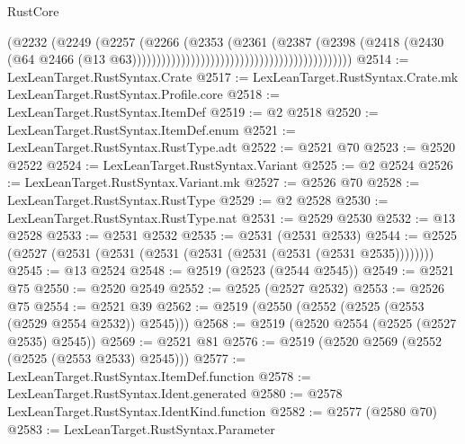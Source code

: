 \begin{lexlean}{RustCore}
\begin{coremodule}
                                                                      (@2232
                                                                        (@2249
                                                                          (@2257
                                                                            (@2266
                                                                              (@2353
                                                                                (@2361
                                                                                  (@2387
                                                                                    (@2398
                                                                                      (@2418
                                                                                        (@2430
                                                                                          (@64
                                                                                            @2466
                                                                                            (@13
                                                                                              @63)))))))))))))))))))))))))))))))))))))))))))))
@2514 := LexLeanTarget.RustSyntax.Crate
@2517 := LexLeanTarget.RustSyntax.Crate.mk LexLeanTarget.RustSyntax.Profile.core
@2518 := LexLeanTarget.RustSyntax.ItemDef
@2519 := @2 @2518
@2520 := LexLeanTarget.RustSyntax.ItemDef.enum
@2521 := LexLeanTarget.RustSyntax.RustType.adt
@2522 := @2521 @70
@2523 := @2520 @2522
@2524 := LexLeanTarget.RustSyntax.Variant
@2525 := @2 @2524
@2526 := LexLeanTarget.RustSyntax.Variant.mk
@2527 := @2526 @70
@2528 := LexLeanTarget.RustSyntax.RustType
@2529 := @2 @2528
@2530 := LexLeanTarget.RustSyntax.RustType.nat
@2531 := @2529 @2530
@2532 := @13 @2528
@2533 := @2531 @2532
@2535 := @2531 (@2531 @2533)
@2544 := @2525 (@2527 (@2531 (@2531 (@2531 (@2531 (@2531 (@2531 (@2531 @2535))))))))
@2545 := @13 @2524
@2548 := @2519 (@2523 (@2544 @2545))
@2549 := @2521 @75
@2550 := @2520 @2549
@2552 := @2525 (@2527 @2532)
@2553 := @2526 @75
@2554 := @2521 @39
@2562 := @2519 (@2550 (@2552 (@2525 (@2553 (@2529 @2554 @2532)) @2545)))
@2568 := @2519 (@2520 @2554 (@2525 (@2527 @2535) @2545))
@2569 := @2521 @81
@2576 := @2519 (@2520 @2569 (@2552 (@2525 (@2553 @2533) @2545)))
@2577 := LexLeanTarget.RustSyntax.ItemDef.function
@2578 := LexLeanTarget.RustSyntax.Ident.generated
@2580 := @2578 LexLeanTarget.RustSyntax.IdentKind.function
@2582 := @2577 (@2580 @70)
@2583 := LexLeanTarget.RustSyntax.Parameter

\end{coremodule}
\end{lexlean}
